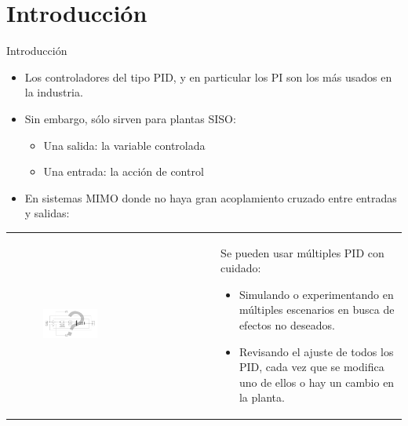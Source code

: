 \documentclass{beamer}
\begin{document}
\section{Introducción} 
\tableofcontents[currentsection]
\begin{frame}{Introducción}
\begin{itemize}
    \item Los controladores del tipo PID, y en particular los PI son los más usados en la industria.

    \item Sin embargo, sólo sirven para plantas SISO:
    \begin{itemize}
        \item Una salida: la variable controlada
        \item Una entrada: la acción de control
    \end{itemize}

    \item En sistemas MIMO donde no haya gran acoplamiento cruzado entre entradas y salidas:

\end{itemize}

\begin{tabularx}{\textwidth}{X X}
    \begin{figure}
        \centering
        \includegraphics[width=0.4\textwidth]{MIMO_PID.pdf}
    \end{figure}
& 
    Se pueden usar múltiples PID con cuidado:
    \begin{itemize}
        \item Simulando o experimentando en múltiples escenarios en busca de efectos no deseados.
        \item Revisando el ajuste de todos los PID, cada vez que se modifica uno de ellos o hay un cambio en la planta.
    \end{itemize}
\\
\end{tabularx}


\end{frame}


\end{document}

